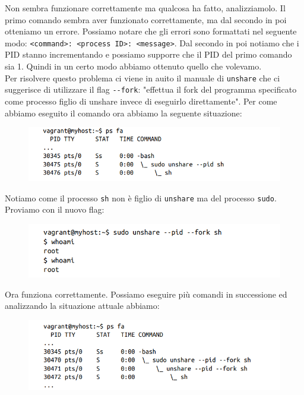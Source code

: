 Non sembra funzionare correttamente ma qualcosa ha fatto, analizziamolo.
Il primo comando sembra aver funzionato correttamente, ma dal secondo in poi
otteniamo un errore. Possiamo notare che gli errori sono formattati nel seguente modo:
\verb|<command>: <process ID>: <message>|. Dal secondo in poi notiamo che i PID
stanno incrementando e possiamo supporre che il PID del primo comando sia 1. Quindi
in un certo modo abbiamo ottenuto quello che volevamo.\\
Per risolvere questo problema ci viene in auito il manuale di \verb|unshare| che ci
suggerisce di utilizzare il flag \verb|--fork|: "effettua il fork del programma
specificato come processo figlio di unshare invece di eseguirlo direttamente".
Per come abbiamo eseguito il comando ora abbiamo la seguente situazione:

\begin{figure}[H]
    \centering
    \includegraphics[width=12cm, keepaspectratio]{capitoli/os_security/imgs/pid2.png}
\end{figure}

Notiamo come il processo \verb|sh| non è figlio di \verb|unshare| ma del processo
\verb|sudo|.\\

Proviamo con il nuovo flag:

\begin{figure}[H]
    \centering
    \includegraphics[width=12cm, keepaspectratio]{capitoli/os_security/imgs/pid3.png}
\end{figure}

Ora funziona correttamente. Possiamo eseguire più comandi in successione ed
analizzando la situazione attuale abbiamo:

\begin{figure}[H]
    \centering
    \includegraphics[width=12cm, keepaspectratio]{capitoli/os_security/imgs/pid4.png}
\end{figure}

